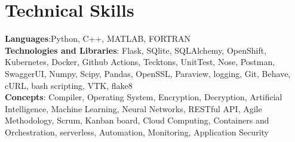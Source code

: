 \section{Technical Skills}
    \begin{itemize}[leftmargin=0.15in, label={}]
	\small{\item{
		\textbf{Languages}{:Python, C++, MATLAB, FORTRAN} \\
		\textbf{Technologies and Libraries}{: Flask, SQlite, SQLAlchemy, OpenShift, Kubernetes, Docker, Github Actions, Tecktons, UnitTest, Nose, Postman, SwaggerUI, Numpy, Scipy, Pandas, OpenSSL, Paraview, logging, Git, Behave, cURL, bash scripting, VTK, flake8} \\
		\textbf{Concepts}{: Compiler, Operating System, Encryption, Decryption, Artificial Intelligence, Machine Learning, Neural Networks, RESTful API,  Agile Methodology, Scrum, Kanban board, Cloud Computing, Containers and Orchestration, serverless, Automation, Monitoring, Application Security}
	}}
    \end{itemize}